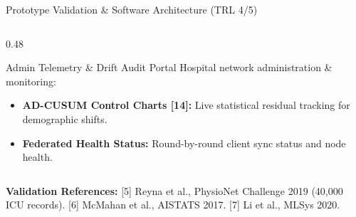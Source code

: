 \documentclass[aspectratio=169, 11pt]{beamer}
\begin{document}
\begin{frame}{Prototype Validation \& Software Architecture (TRL 4/5)}
\begin{columns}[t]
\begin{column}{0.48\textwidth}
            \begin{block}{\textcolor{neonRose}{Admin Telemetry \& Drift Audit Portal}}
                \tiny
                Hospital network administration \& monitoring:
                \begin{itemize}
                    \item \textbf{AD-CUSUM Control Charts [14]:} Live statistical residual tracking for demographic shifts.
                    \item \textbf{Federated Health Status:} Round-by-round client sync status and node health.
                \end{itemize}
            \end{block}
        \end{column}
    \end{columns}

    \vspace{0.02cm}
    \begin{block}{}
        \tiny \textcolor{neonCyan}{\textbf{Validation References:}} \textcolor{mutedText}{[5] Reyna et al., PhysioNet Challenge 2019 (40,000 ICU records). [6] McMahan et al., AISTATS 2017. [7] Li et al., MLSys 2020.}
    \end{block}
\end{frame}
\end{document}
